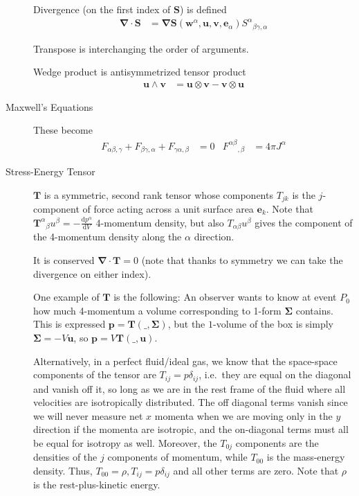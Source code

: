 \documentclass[12pt]{report}
\newcommand{\rd}[2]{\frac{\mathrm{d}#1}{\mathrm{d}#2}}
\newcommand{\bm}[1]{\boldsymbol{\mathbf{#1}}}
\begin{document}
\begin{description}
        Divergence (on the first index of $\bm{S}$) is defined
        \begin{align}
            \bm{\nabla} \cdot \bm{S} &= \bm{\nabla} \bm{S}
                (\bm{w}^\alpha, \bm{u}, \bm{v}, \bm{e}_\alpha)
            {S^{\alpha}}_{\beta\gamma,\alpha}
        \end{align}

        Transpose is interchanging the order of arguments.

        Wedge product is antisymmetrized tensor product
        \begin{align}
            \bm{u} \wedge \bm{v} &= \bm{u} \otimes \bm{v} -
                \bm{v} \otimes \bm{u}
        \end{align}

    \item[Maxwell's Equations] These become
        \begin{align}
            F_{\alpha\beta,\gamma} + F_{\beta\gamma, \alpha} +
            F_{\gamma\alpha,\beta} &= 0 &
            {F^{\alpha\beta}}_{,\beta} &= 4\pi J^\alpha
        \end{align}

    \item[Stress-Energy Tensor] $\bm{T}$ is a symmetric, second rank tensor
        whose components $T_{jk}$ is the $j$-component of force acting across a
        unit surface area $\bm{e}_k$. Note that ${\bm{T}^\alpha}_\beta
        u^\beta = -\rd{p^\alpha}{V}$ 4-momentum density, but also
        $T_{\alpha\beta} u^\beta$ gives the component of the 4-momentum density
        along the $\alpha$ direction.

        It is conserved $\bm{\nabla} \cdot \bm{T} = 0$ (note that thanks
        to symmetry we can take the divergence on either index).

        One example of $\bm{T}$ is the following: An observer wants to know
        at event $P_0$ how much 4-momentum a volume corresponding to 1-form
        $\bm{\Sigma}$ contains. This is expressed $\bm{p} =
        \bm{T}(\_, \bm{\Sigma})$, but the $1$-volume of the box is
        simply $\bm{\Sigma} = -V \bm{u}$, so $\bm{p} = V
        \bm{T}(\_, \bm{u})$.

        Alternatively, in a perfect fluid/ideal gas, we know that the
        space-space components of the tensor are $T_{ij} = p\delta_{ij}$, i.e.\
        they are equal on the diagonal and vanish off it, so long as we are in
        the rest frame of the fluid where all velocities are isotropically
        distributed. The off diagonal terms vanish since we will never measure
        net $x$ momenta when we are moving only in the $y$ direction if the
        momenta are isotropic, and the on-diagonal terms must all be equal for
        isotropy as well. Moreover, the $T_{0j}$ components are the densities of
        the $j$ components of momentum, while $T_{00}$ is the mass-energy
        density. Thus, $T_{00} = \rho, T_{ij} = p\delta_{ij}$ and all other
        terms are zero. Note that $\rho$ is the rest-plus-kinetic energy.

\end{description}
\end{document}
